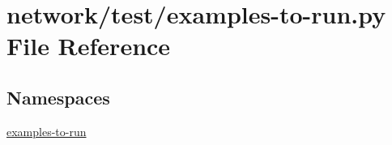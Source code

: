 \hypertarget{network_2test_2examples-to-run_8py}{}\section{network/test/examples-\/to-\/run.py File Reference}
\label{network_2test_2examples-to-run_8py}
\subsection*{Namespaces}
\begin{DoxyCompactItemize}
\item 
 \hyperlink{namespaceexamples-to-run}{examples-\/to-\/run}
\end{DoxyCompactItemize}
